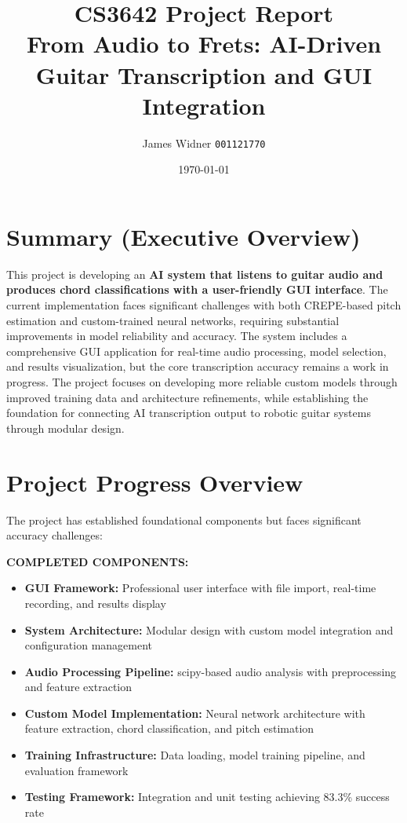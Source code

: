 \documentclass[11pt]{article}
\title{CS3642 Project Report\\[4pt]
\large From Audio to Frets: AI-Driven Guitar Transcription and GUI Integration}
\author{James Widner \quad \texttt{001121770}}
\date{\today}
\begin{document}
\maketitle

\section*{Summary (Executive Overview)}
This project is developing an \textbf{AI system that listens to guitar audio and produces chord classifications with a user-friendly GUI interface}. The current implementation faces significant challenges with both CREPE-based pitch estimation and custom-trained neural networks, requiring substantial improvements in model reliability and accuracy. The system includes a comprehensive GUI application for real-time audio processing, model selection, and results visualization, but the core transcription accuracy remains a work in progress. The project focuses on developing more reliable custom models through improved training data and architecture refinements, while establishing the foundation for connecting AI transcription output to robotic guitar systems through modular design.

\section*{Project Progress Overview}
The project has established foundational components but faces significant accuracy challenges:

\textbf{COMPLETED COMPONENTS:}
\begin{itemize}[leftmargin=*,itemsep=2pt]
  \item \textbf{GUI Framework:} Professional user interface with file import, real-time recording, and results display
  \item \textbf{System Architecture:} Modular design with custom model integration and configuration management
  \item \textbf{Audio Processing Pipeline:} scipy-based audio analysis with preprocessing and feature extraction
  \item \textbf{Custom Model Implementation:} Neural network architecture with feature extraction, chord classification, and pitch estimation
  \item \textbf{Training Infrastructure:} Data loading, model training pipeline, and evaluation framework
  \item \textbf{Testing Framework:} Integration and unit testing achieving 83.3\% success rate
\end{itemize}
\end{document}

